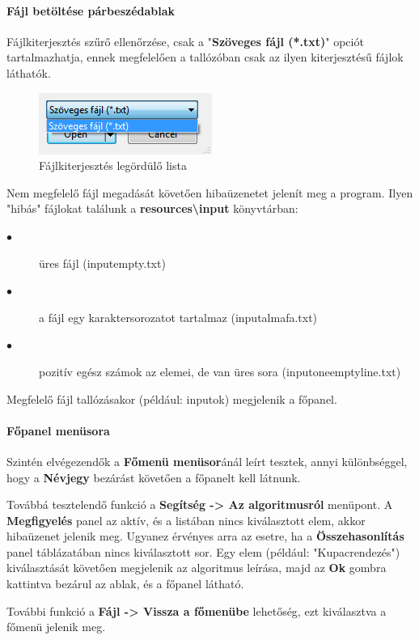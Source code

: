 \documentclass{elteikthesis}
\begin{document}
\paragraph{Fájl betöltése párbeszédablak}
Fájlkiterjesztés szűrő ellenőrzése, csak a "\textbf{Szöveges fájl (*.txt)}" opciót tartalmazhatja, ennek megfelelően a tallózóban csak az ilyen kiterjesztésű fájlok láthatók.
\begin{figure}[H]
	\centering
	\includegraphics{pics/test/fileextension.png}
	\caption{Fájlkiterjesztés legördülő lista}
\end{figure}
Nem megfelelő fájl megadását követően hibaüzenetet jelenít meg a program. Ilyen "hibás" fájlokat találunk a \textbf{resources\textbackslash input} könyvtárban:
\begin{description}
	\item[$\bullet$] üres fájl (input\textunderscore empty.txt)
	\item[$\bullet$] a fájl egy karaktersorozatot tartalmaz (input\textunderscore almafa.txt)
	\item[$\bullet$] pozitív egész számok az elemei, de van üres sora (input\textunderscore oneemptyline.txt)
\end{description}\par
Megfelelő fájl tallózásakor (például: input\textunderscore ok) megjelenik a főpanel.
\paragraph{Főpanel menüsora}
Szintén elvégezendők a \textbf{Főmenü menüsor}ánál leírt tesztek, annyi különbséggel, hogy a \textbf{Névjegy} bezárást követően a főpanelt kell látnunk.\par
Továbbá tesztelendő funkció a \textbf{Segítség -> Az algoritmusról} menüpont. A \textbf{Megfigyelés} panel az aktív, és a listában nincs kiválasztott elem, akkor hibaüzenet jelenik meg. Ugyanez érvényes arra az esetre, ha a \textbf{Összehasonlítás} panel táblázatában nincs kiválasztott sor. Egy elem (például: "Kupacrendezés") kiválasztását követően megjelenik az algoritmus leírása, majd az \textbf{Ok} gombra kattintva bezárul az ablak, és a főpanel látható.\par
További funkció a \textbf{Fájl -> Vissza a főmenübe} lehetőség, ezt kiválasztva a főmenü jelenik meg.
\end{document}
